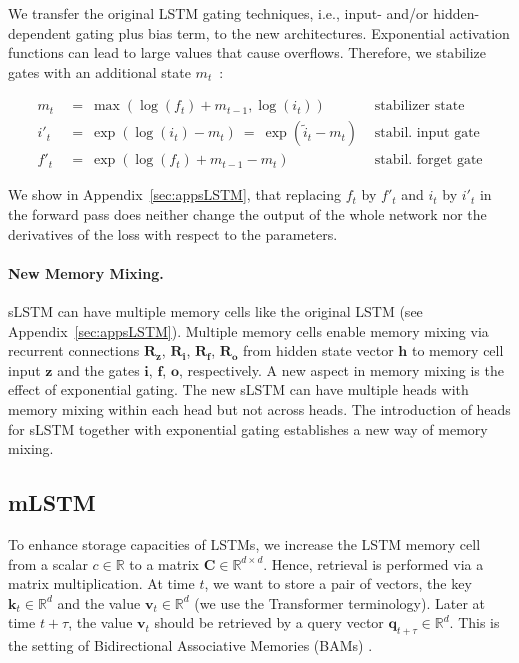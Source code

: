 We transfer the original LSTM gating techniques, i.e., input- and/or hidden-dependent gating plus bias term, to the new architectures. Exponential activation functions can lead to large values that cause overflows. Therefore, we stabilize gates with an additional state \mbox{$m_t$~\citep{Milakov:18arxiv}}:

\begin{align}
\label{eq:slstmstabil}
m_t \ &= \ \max \left( \log ( f_t ) + m_{t-1} , \log ( i_t ) \right) &\text{stabilizer state} \\
i'_t \ &= \ \!\exp \left( \log \left ( i_t \right) - m_t \right) \ = \ \!\exp \left( \tilde{i}_t - m_t \right) \ \, 
  &\text{stabil. input gate} \\
f'_t \ &= \ \!\exp \left( \log \left( f_t \right) + m_{t-1} - m_t \right) \ \, 
  &\text{stabil. forget gate}
\end{align}

We show in Appendix~\ref{sec:appsLSTM}, that replacing $f_t$ by $f'_t$ and $i_t$ by $i'_t$ in the forward pass does neither change the output of the whole network nor the derivatives of the loss with respect to the parameters. 

\paragraph{New Memory Mixing.} sLSTM can have multiple memory cells like the original LSTM (see Appendix~\ref{sec:appsLSTM}).
Multiple memory cells enable memory mixing via recurrent connections $\mathbf{R}_{\mathbf{z}}$, $\mathbf{R}_{\mathbf{i}}$, $\mathbf{R}_{\mathbf{f}}$, $\mathbf{R}_{\mathbf{o}}$ 
from hidden state vector $\mathbf{h}$ to memory cell input $\mathbf{z}$ and the gates
$\mathbf{i}$, $\mathbf{f}$, $\mathbf{o}$, respectively. A new aspect in memory mixing is the effect of exponential gating. The new sLSTM can have multiple heads with memory mixing within each head but not across heads. The introduction of heads for sLSTM together with exponential gating establishes a new way of memory mixing.

\subsection{mLSTM}
\label{sec:mLSTM}

To enhance storage capacities of LSTMs, we increase the LSTM memory cell from a scalar $c \in \mathbb{R}$
to a matrix $\mathbf{C} \in \mathbb{R}^{d \times d}$. Hence, retrieval is performed via a matrix multiplication. At time $t$, we want to store a pair of vectors, the key $\mathbf{k}_t \in \mathbb{R}^d$ and the value $\mathbf{v}_t \in \mathbb{R}^d$
(we use the Transformer terminology). Later at time $t + \tau$, the value $\mathbf{v}_t$ should be retrieved by a query vector $\mathbf{q}_{t+\tau} \in \mathbb{R}^d$.
This is the setting of Bidirectional Associative Memories (BAMs) \citep{Kohonen:72,Anderson:72,Nakano:72,Anderson:77}.

